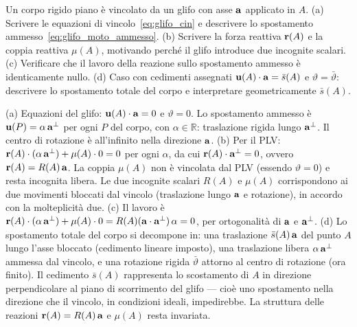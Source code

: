 \begin{esercizio}[Glifo]
	\label{ex:C04_glifo}
	
	Un corpo rigido piano è vincolato da un glifo con asse $\mathbf{a}$ applicato in $A$.
	(a) Scrivere le equazioni di vincolo~\eqref{eq:glifo_cin} e descrivere lo spostamento ammesso~\eqref{eq:glifo_moto_ammesso}.
	(b) Scrivere la forza reattiva $\mathbf{r}(A)$ e la coppia reattiva $\mu(A)$, motivando perché il glifo introduce due incognite scalari.
	(c) Verificare che il lavoro della reazione sullo spostamento ammesso è identicamente nullo.
	(d) Caso con cedimenti assegnati $\mathbf{u}(A)\cdot\mathbf{a} = \bar{s}(A)$ e $\vartheta = \bar{\vartheta}$: descrivere lo spostamento totale del corpo e interpretare geometricamente $\bar{s}(A)$.
	
	\risultato (a) Equazioni del glifo: $\mathbf{u}(A)\cdot\mathbf{a} = 0$ e $\vartheta = 0$. Lo spostamento ammesso è $\mathbf{u}(P) = \alpha\,\mathbf{a}^{\perp}$ per ogni $P$ del corpo, con $\alpha \in \mathbb{R}$: traslazione rigida lungo $\mathbf{a}^{\perp}$. Il centro di rotazione è all'infinito nella direzione $\mathbf{a}$. (b) Per il PLV: $\mathbf{r}(A)\cdot(\alpha\,\mathbf{a}^{\perp}) + \mu(A)\cdot 0 = 0$ per ogni $\alpha$, da cui $\mathbf{r}(A)\cdot\mathbf{a}^{\perp} = 0$, ovvero $\mathbf{r}(A) = R(A)\,\mathbf{a}$. La coppia $\mu(A)$ non è vincolata dal PLV (essendo $\vartheta = 0$) e resta incognita libera. Le due incognite scalari $R(A)$ e $\mu(A)$ corrispondono ai due movimenti bloccati dal vincolo (traslazione lungo $\mathbf{a}$ e rotazione), in accordo con la molteplicità due. (c) Il lavoro è $\mathbf{r}(A)\cdot(\alpha\,\mathbf{a}^{\perp}) + \mu(A)\cdot 0 = R(A)(\mathbf{a}\cdot\mathbf{a}^{\perp})\,\alpha = 0$, per ortogonalità di $\mathbf{a}$ e $\mathbf{a}^{\perp}$. (d) Lo spostamento totale del corpo si decompone in: una traslazione $\bar{s}(A)\,\mathbf{a}$ del punto $A$ lungo l'asse bloccato (cedimento lineare imposto), una traslazione libera $\alpha\,\mathbf{a}^{\perp}$ ammessa dal vincolo, e una rotazione rigida $\bar{\vartheta}$ attorno al centro di rotazione (ora finito). Il cedimento $\bar{s}(A)$ rappresenta lo scostamento di $A$ in direzione perpendicolare al piano di scorrimento del glifo --- cioè uno spostamento nella direzione che il vincolo, in condizioni ideali, impedirebbe. La struttura delle reazioni $\mathbf{r}(A) = R(A)\,\mathbf{a}$ e $\mu(A)$ resta invariata.
	
\end{esercizio}

